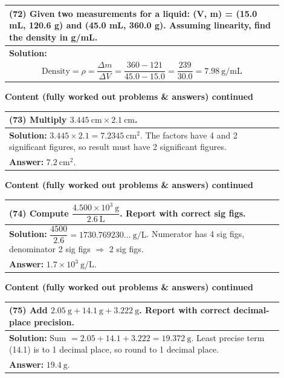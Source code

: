 \documentclass{article}
\begin{document}
\begin{tabular}{|p{0.9\linewidth}|}
\hline
\vspace{0.2cm}

\textbf{(72)} Given two measurements for a liquid: (V, m) = (15.0 mL, 120.6 g) and (45.0 mL, 360.0 g). Assuming linearity, find the density in g/mL. \\
\hline
\textbf{Solution:} \\
\[
\text{Density} = \rho=\frac{\Delta m}{\Delta V}=\frac{360-121}{45.0-15.0}=\frac{239}{30.0}=7.98~\text{g/mL}
\]
\\
\hline
\end{tabular}
\newpage
\noindent
{\large \textbf{Content (fully worked out problems \& answers) continued}} \\[0.2em]

\begin{tabular}{|p{0.9\linewidth}|}
\hline
\vspace{0.2cm}

\textbf{(73)} Multiply $3.445~\text{cm}\times 2.1~\text{cm}$. \\
\hline
\vspace{0.2cm}
\textbf{Solution:} $3.445\times 2.1=7.2345~\text{cm}^2$. The factors have 4 and 2 significant figures, so result must have 2 significant figures. \\
\textbf{Answer:} $7.2~\text{cm}^2$. \\
\hline
\end{tabular}
\newpage

\noindent
{\large \textbf{Content (fully worked out problems \& answers) continued}} \\[0.2em]
\begin{tabular}{|p{0.9\linewidth}|}
\hline
\vspace{0.2cm}

\textbf{(74)} Compute $\dfrac{4.500\times 10^{3}~\text{g}}{2.6~\text{L}}$. Report with correct sig figs. \\
\hline
\vspace{0.2cm}
\textbf{Solution:} $\dfrac{4500}{2.6}=1730.769230\dots~\text{g/L}$. Numerator has 4 sig figs, denominator 2 sig figs $\Rightarrow$ 2 sig figs. \\
\textbf{Answer:} $1.7\times 10^{3}~\text{g/L}$. \\
\hline
\end{tabular}
\newpage

\noindent
{\large \textbf{Content (fully worked out problems \& answers) continued}} \\[0.2em]
\begin{tabular}{|p{0.9\linewidth}|}
\hline
\vspace{0.2cm}

\textbf{(75)} Add $2.05~\text{g} + 14.1~\text{g} + 3.222~\text{g}$. Report with correct decimal-place precision. \\
\hline
\vspace{0.2cm}
\textbf{Solution:} Sum $=2.05+14.1+3.222=19.372~\text{g}$. Least precise term (14.1) is to 1 decimal place, so round to 1 decimal place. \\
\textbf{Answer:} $19.4~\text{g}$. \\
\hline
\end{tabular}
\newpage
\end{document}
